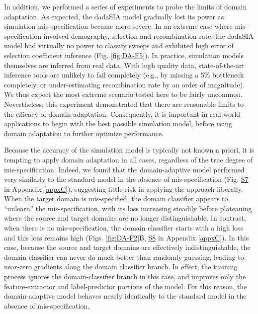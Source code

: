 In addition, we performed a series of experiments to probe the limits of domain adaptation. As expected, the \ac{dadaSIA} model gradually lost its power as simulation mis-specification became more severe. In an extreme case where mis-specification involved demography, selection and recombination rate, the \ac{dadaSIA} model had virtually no power to classify sweeps and exhibited high error of selection coefficient inference (Fig. \ref{fig:DA-F5}). In practice, simulation models themselves are inferred from real data. With high quality data, state-of-the-art inference tools are unlikely to fail completely (e.g., by missing a 5\% bottleneck completely, or under-estimating recombination rate by an order of magnitude). We thus expect the most extreme scenario tested here to be fairly uncommon. Nevertheless, this experiment demonstrated that there are reasonable limits to the efficacy of domain adaptation. Consequently, it is important in real-world applications to begin with the best possible simulation model, before using domain adaptation to further optimize performance.

Because the accuracy of the simulation model is typically not known a priori, it is tempting to apply domain adaptation in all cases, regardless of the true degree of mis-specification. Indeed, we found that the domain-adaptive model performed very similarly to the standard model in the absence of mis-specification (Fig. \href{https://journals.plos.org/plosgenetics/article?id=10.1371/journal.pgen.1011032#sec018}{S7} in Appendix \ref{appxC}), suggesting little risk in applying the approach liberally. When the target domain is mis-specified, the domain classifier appears to “unlearn” the mis-specification, with its loss increasing steadily before plateauing where the source and target domains are no longer distinguishable. In contrast, when there is no mis-specification, the domain classifier starts with a high loss and this loss remains high (Figs. \ref{fig:DA-F2}B, \href{https://journals.plos.org/plosgenetics/article?id=10.1371/journal.pgen.1011032#sec018}{S8} in Appendix \ref{appxC}). In this case, because the source and target domains are effectively indistinguishable, the domain classifier can never do much better than randomly guessing, leading to near-zero gradients along the domain classifier branch. In effect, the training process ignores the domain-classifier branch in this case, and improves only the feature-extractor and label-predictor portions of the model. For this reason, the domain-adaptive model behaves nearly identically to the standard model in the absence of mis-specification.


